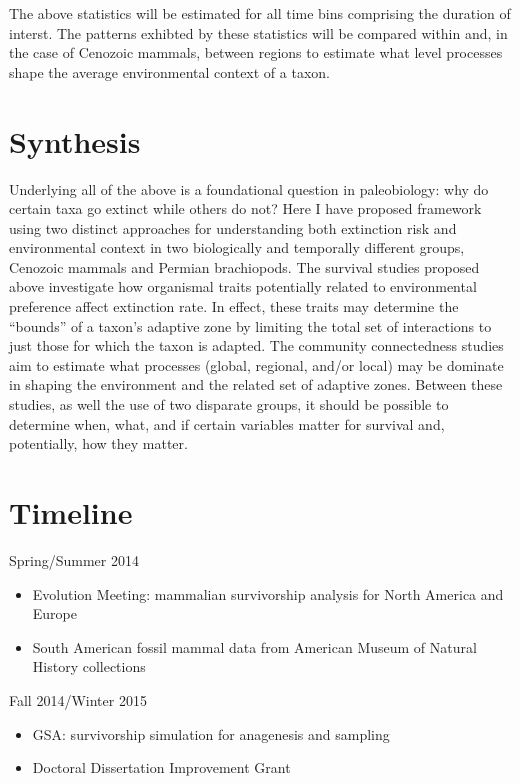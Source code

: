 \documentclass[12pt,letterpaper]{article}
\begin{document}
The above statistics will be estimated for all time bins comprising the duration of interst. The patterns exhibted by these statistics will be compared within and, in the case of Cenozoic mammals, between regions to estimate what level processes shape the average environmental context of a taxon.


\section{Synthesis}
Underlying all of the above is a foundational question in paleobiology: why do certain taxa go extinct while others do not? Here I have proposed framework using two distinct approaches for understanding both extinction risk and environmental context in two biologically and temporally different groups, Cenozoic mammals and Permian brachiopods. The survival studies proposed above investigate how organismal traits potentially related to environmental preference affect extinction rate. In effect, these traits may determine the ``bounds'' of a taxon's adaptive zone by limiting the total set of interactions to just those for which the taxon is adapted. The community connectedness studies aim to estimate what processes (global, regional, and/or local) may be dominate in shaping the environment and the related set of adaptive zones. Between these studies, as well the use of two disparate groups, it should be possible to determine when, what, and if certain variables matter for survival and, potentially, how they matter. 

\clearpage

\section{Timeline}

Spring/Summer 2014
\begin{itemize}
  \item Evolution Meeting: mammalian survivorship analysis for North America and Europe
  \item South American fossil mammal data from American Museum of Natural History collections
\end{itemize}

Fall 2014/Winter 2015
\begin{itemize}
  \item GSA: survivorship simulation for anagenesis and sampling
  \item Doctoral Dissertation Improvement Grant
\end{itemize}
\end{document}
